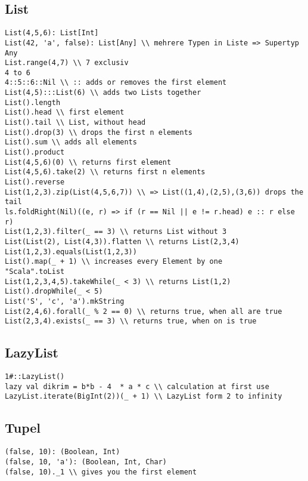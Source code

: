 \subsection{List}
\begin{verbatim}
List(4,5,6): List[Int]
List(42, 'a', false): List[Any] \\ mehrere Typen in Liste => Supertyp Any
List.range(4,7) \\ 7 exclusiv
4 to 6
4::5::6::Nil \\ :: adds or removes the first element
List(4,5):::List(6) \\ adds two Lists together
List().length
List().head \\ first element
List().tail \\ List, without head
List().drop(3) \\ drops the first n elements
List().sum \\ adds all elements
List().product
List(4,5,6)(0) \\ returns first element
List(4,5,6).take(2) \\ returns first n elements
List().reverse
List(1,2,3).zip(List(4,5,6,7)) \\ => List((1,4),(2,5),(3,6)) drops the tail
ls.foldRight(Nil)((e, r) => if (r == Nil || e != r.head) e :: r else r)
List(1,2,3).filter(_ == 3) \\ returns List without 3
List(List(2), List(4,3)).flatten \\ returns List(2,3,4)
List(1,2,3).equals(List(1,2,3))
List().map(_ + 1) \\ increases every Element by one
"Scala".toList
List(1,2,3,4,5).takeWhile(_ < 3) \\ returns List(1,2)
List().dropWhile(_ < 5)
List('S', 'c', 'a').mkString
List(2,4,6).forall(_ % 2 == 0) \\ returns true, when all are true
List(2,3,4).exists(_ == 3) \\ returns true, when on is true
\end{verbatim}
\subsection{LazyList}
\begin{verbatim}
1#::LazyList()
lazy val dikrim = b*b - 4  * a * c \\ calculation at first use
LazyList.iterate(BigInt(2))(_ + 1) \\ LazyList form 2 to infinity
\end{verbatim}
\subsection{Tupel}
\begin{verbatim}
(false, 10): (Boolean, Int)
(false, 10, 'a'): (Boolean, Int, Char)
(false, 10)._1 \\ gives you the first element
\end{verbatim}
